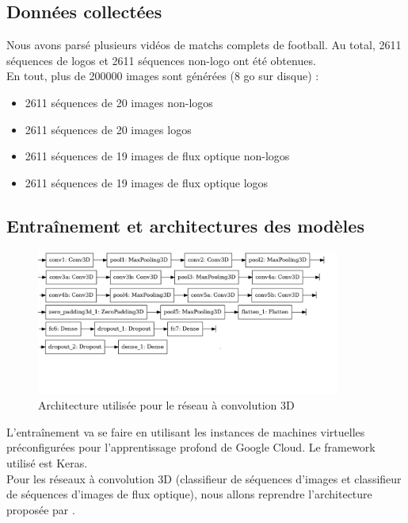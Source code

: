 \documentclass[11pt]{article}
\begin{document}
\subsection{Données collectées}
\label{sec:org2585d90}
Nous avons parsé plusieurs vidéos de matchs complets de football. Au total, 2611 séquences de logos et 2611 séquences non-logo ont été obtenues.\\
En tout, plus de 200000 images sont générées (8 go sur disque) :\\
\begin{itemize}
\item 2611 séquences de 20 images non-logos\\
\item 2611 séquences de 20 images logos\\
\item 2611 séquences de 19 images de flux optique non-logos\\
\item 2611 séquences de 19 images de flux optique logos\\
\end{itemize}

\subsection{Entraînement et architectures des modèles}
\label{sec:org8af539b}
\begin{figure}[htbp]
\centering
\includegraphics[width=10cm]{c3d_model.png}
\caption{Architecture utilisée pour le réseau à convolution 3D}
\end{figure}

L'entraînement va se faire en utilisant les instances de machines virtuelles préconfigurées pour l'apprentissage profond de Google Cloud. Le framework utilisé est Keras.\\
Pour les réseaux à convolution 3D (classifieur de séquences d'images et classifieur de séquences d'images de flux optique), nous allons reprendre l'architecture proposée par \cite{Tran_2015}.\\
\end{document}
